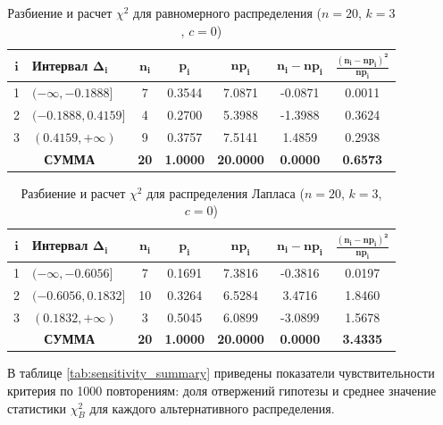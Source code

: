 \documentclass[a4paper, 14pt]{extarticle}
\begin{document}
\begin{table}[H]
    \centering
    \caption{Разбиение и расчет $\chi^2$ для равномерного распределения ($n=20$, $k=3$, $c=0$)}
    \label{tab:breakdown_uniform}
    \begin{tabular}{|c|l|c|c|c|c|c|}
        \hline
        $\mathbf{i}$ & \textbf{Интервал} $\mathbf{\Delta_i}$ & $\mathbf{n_i}$ & $\mathbf{p_i}$ & $\mathbf{np_i}$ & $\mathbf{n_i - np_i}$ & $\mathbf{\frac{(n_i - np_i)^2}{np_i}}$ \\ \hline
        1 & $(-\infty, -0.1888]$ & 7 & 0.3544 & 7.0871 & -0.0871  & 0.0011 \\ \hline
        2 & $(-0.1888, 0.4159]$ & 4 & 0.2700 & 5.3988 & -1.3988 & 0.3624 \\ \hline
        3 & $(0.4159, +\infty)$ & 9 & 0.3757 & 7.5141 & 1.4859  & 0.2938 \\ \hline
        \multicolumn{2}{|c|}{\textbf{СУММА}} & \textbf{20} & \textbf{1.0000} & \textbf{20.0000} & \textbf{0.0000} & \textbf{0.6573} \\ \hline
    \end{tabular}
\end{table}

\begin{table}[H]
    \centering
    \caption{Разбиение и расчет $\chi^2$ для распределения Лапласа ($n=20$, $k=3$, $c=0$)}
    \label{tab:breakdown_laplace}
    \begin{tabular}{|c|l|c|c|c|c|c|}
        \hline
        $\mathbf{i}$ & \textbf{Интервал} $\mathbf{\Delta_i}$ & $\mathbf{n_i}$ & $\mathbf{p_i}$ & $\mathbf{np_i}$ & $\mathbf{n_i - np_i}$ & $\mathbf{\frac{(n_i - np_i)^2}{np_i}}$ \\ \hline
        1 & $(-\infty, -0.6056]$ & 7  & 0.1691 & 7.3816 & -0.3816 & 0.0197 \\ \hline
        2 & $(-0.6056, 0.1832]$  & 10 & 0.3264 & 6.5284 & 3.4716  & 1.8460 \\ \hline
        3 & $(0.1832, +\infty)$ & 3  & 0.5045 & 6.0899 & -3.0899 & 1.5678 \\ \hline
        \multicolumn{2}{|c|}{\textbf{СУММА}} & \textbf{20} & \textbf{1.0000} & \textbf{20.0000} & \textbf{0.0000} & \textbf{3.4335} \\ \hline
    \end{tabular}
\end{table}

В таблице \ref{tab:sensitivity_summary} приведены показатели чувствительности критерия по 1000 повторениям: доля отвержений гипотезы и среднее значение статистики $\chi^2_{\textit{B}}$ для каждого альтернативного распределения.
\end{document}
